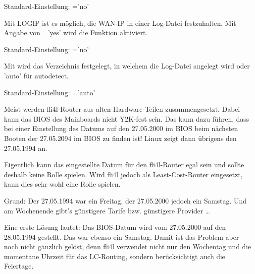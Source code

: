   Standard-Einstellung: ='no'



  Mit LOGIP ist es möglich, die WAN-IP in einer Log-Datei festzuhalten. Mit Angabe von
  ='yes' wird die Funktion aktiviert.

  Standard-Einstellung: ='no'

\begin{description}

  Mit  wird das Verzeichnis festgelegt, in welchem die
  Log-Datei angelegt wird oder 'auto' für autodetect.

  Standard-Einstellung: ='auto'
\end{description}


  Meist werden fli4l-Router aus alten Hardware-Teilen zusammengesetzt.
  Dabei kann das BIOS des Mainboards nicht Y2K-fest sein. Das kann dazu führen,
  dass bei einer Einstellung des Datums auf den 27.05.2000 im BIOS beim
  nächsten Booten der 27.05.2094 im BIOS zu finden ist! Linux zeigt dann
  übrigens den 27.05.1994 an.

  Eigentlich kann das eingestellte Datum für den fli4l-Router egal
  sein und sollte deshalb keine Rolle spielen. Wird fli4l jedoch als
  Least-Cost-Router eingesetzt, kann dies sehr wohl eine Rolle spielen.

  Grund: Der 27.05.1994 war ein Freitag, der 27.05.2000 jedoch ein
  Samstag. Und am Wochenende gibt's günstigere Tarife bzw. günstigere
  Provider \ldots

  Eine erste Lösung lautet: Das BIOS-Datum wird vom 27.05.2000 auf den
  28.05.1994 gestellt. Das war ebenso ein Samstag. Damit ist das Problem aber
  noch nicht gänzlich gelöst, denn fli4l verwendet nicht nur den Wochentag und
  die momentane Uhrzeit für das LC-Routing, sondern berücksichtigt auch die
  Feiertage.

